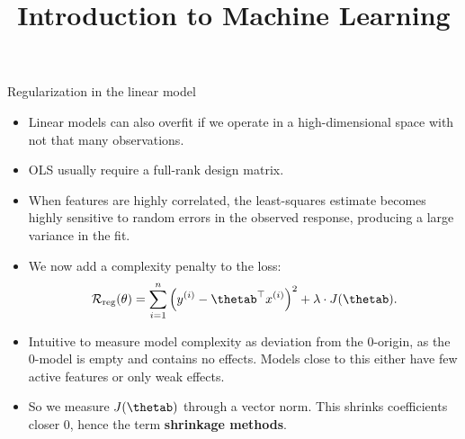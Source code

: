 



\newcommand{\titlefigure}{figure_man/ridge_hat.png}
\newcommand{\learninggoals}{
  \item Know the regularized linear model
  \item Know Ridge regression ($L2$ penalty)
  \item Know Lasso regression ($L1$ penalty)
}

\title{Introduction to Machine Learning}
\date{}





\begin{vbframe}{Regularization in the linear model}

  \begin{itemize}
  \item Linear models can also overfit if we operate in a high-dimensional space with not that many observations.    
  \item OLS usually require a full-rank design matrix.
  \item When features are highly correlated, the least-squares estimate becomes highly sensitive to random errors in the observed response, producing a large variance in the fit. 
  \item We now add a complexity penalty to the loss:
  $$
  \riskrt = \sumin \left(\yi - \thetab^\top \xi \right)^2 + \lambda \cdot J(\thetab). 
  $$ 
  \item Intuitive to measure model complexity as deviation from the 0-origin, as the 0-model is empty and contains no effects. Models close to this either have few active features or only weak effects. 
  \item So we measure $J(\thetab)$ through a vector norm.
    This shrinks coefficients closer 0, hence the term \textbf{shrinkage methods}.
  \end{itemize}

\end{vbframe}



